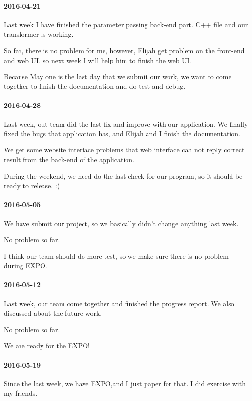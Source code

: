\paragraph{2016-04-21}
Last week I have finished the parameter passing back-end part. C++ file and our transformer is working.


So far, there is no problem for me, however, Elijah get problem on the front-end and web UI, so next week I will help him to finish the web UI.


Because May one is the last day that we submit our work, we want to come together to finish the documentation and do test and debug.

\paragraph{2016-04-28}
Last week, out team did the last fix and improve with our application. We finally fixed the bugs that application has, and Elijah and I finish the documentation.


We get some website interface problems that web interface can not reply correct result from the back-end of the application.


During the weekend, we need do the last check for our program, so it should be ready to release. :)

\paragraph{2016-05-05}
We have submit our project, so we basically didn't change anything last week.


No problem so far.


I think our team should do more test, so we make sure there is no problem during EXPO.

\paragraph{2016-05-12}
Last week, our team come together and finished the progress report. We also discussed about the future work.


No problem so far.


We are ready for the EXPO!

\paragraph{2016-05-19}
Since the last week, we have EXPO,and I just paper for that. I did exercise with my friends.


